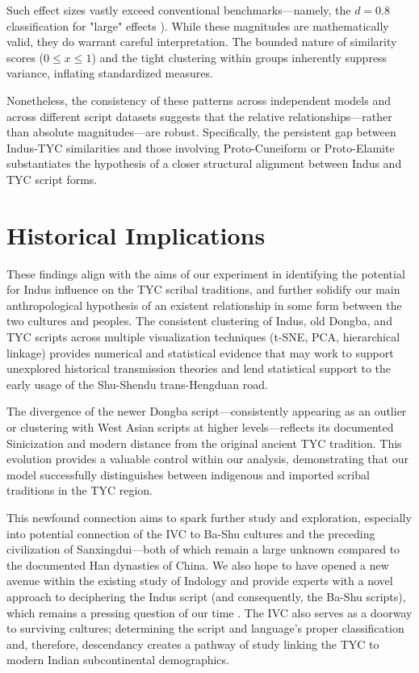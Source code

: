 \documentclass[11pt,a4paper,oneside]{report}
\begin{document}
Such effect sizes vastly exceed conventional benchmarks—namely, the $d=0.8$ classification for "large" effects \cite{cohen_statistical_1988}). While these magnitudes are mathematically valid, they do warrant careful interpretation. The bounded nature of similarity scores ($0 \leq x \leq 1$) and the tight clustering within groups inherently suppress variance, inflating standardized measures.

Nonetheless, the consistency of these patterns across independent models and across different script datasets suggests that the relative relationships—rather than absolute magnitudes—are robust. Specifically, the persistent gap between Indus-TYC similarities and those involving Proto-Cuneiform or Proto-Elamite substantiates the hypothesis of a closer structural alignment between Indus and TYC script forms.

\section{Historical Implications}
\noindent\hspace{1cm}
These findings align with the aims of our experiment in identifying the potential for Indus influence on the TYC scribal traditions, and further solidify our main anthropological hypothesis of an existent relationship in some form between the two cultures and peoples. The consistent clustering of Indus, old Dongba, and TYC scripts across multiple visualization techniques (t-SNE, PCA, hierarchical linkage) provides numerical and statistical evidence that may work to support unexplored historical transmission theories and lend statistical support to the early usage of the Shu-Shendu trans-Hengduan road.

The divergence of the newer Dongba script—consistently appearing as an outlier or clustering with West Asian scripts at higher levels—reflects its documented Sinicization and modern distance from the original ancient TYC tradition. This evolution provides a valuable control within our analysis, demonstrating that our model successfully distinguishes between indigenous and imported scribal traditions in the TYC region.

This newfound connection aims to spark further study and exploration, especially into potential connection of the IVC to Ba-Shu cultures and the preceding civilization of Sanxingdui—both of which remain a large unknown compared to the documented Han dynasties of China. We also hope to have opened a new avenue within the existing study of Indology and provide experts with a novel approach to deciphering the Indus script (and consequently, the Ba-Shu scripts), which remains a pressing question of our time \cite{kb_want_2025}. The IVC also serves as a doorway to surviving cultures; determining the script and language's proper classification and, therefore, descendancy creates a pathway of study linking the TYC to modern Indian subcontinental demographics.
\end{document}
